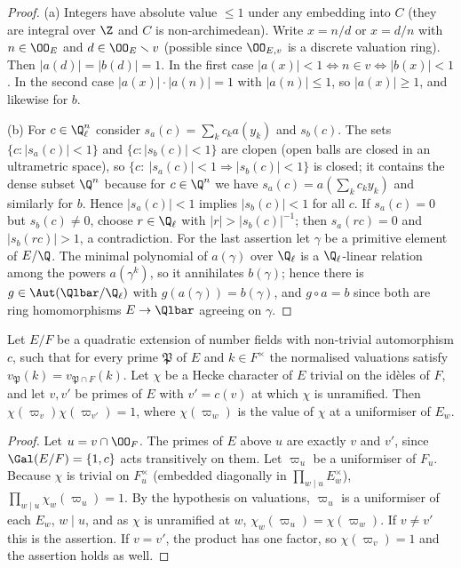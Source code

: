 \begin{proof}
(a) Integers have absolute value $\le1$ under any embedding into $C$ (they are integral over $\Z$ and $C$ is
non-archimedean). Write $x=n/d$ or $x=d/n$ with $n\in\OO_E$ and $d\in\OO_E\smallsetminus v$ (possible since
$\OO_{E,v}$ is a discrete valuation ring). Then $|a(d)|=|b(d)|=1$. In the first case
$|a(x)|<1\iff n\in v\iff|b(x)|<1$. In the second case $|a(x)|\cdot|a(n)|=1$ with $|a(n)|\le1$, so $|a(x)|\ge1$, and
likewise for $b$.

(b) For $c\in\Q_\ell^n$ consider $s_a(c)=\sum_kc_ka(y_k)$ and $s_b(c)$. The sets $\{c:|s_a(c)|<1\}$ and $\{c:|s_b(c)|<1\}$
are clopen (open balls are closed in an ultrametric space), so $\{c:\ |s_a(c)|<1\Rightarrow|s_b(c)|<1\}$ is closed; it
contains the dense subset $\Q^n$ because for $c\in\Q^n$ we have $s_a(c)=a(\sum_kc_ky_k)$ and similarly for $b$. Hence
$|s_a(c)|<1$ implies $|s_b(c)|<1$ for all $c$. If $s_a(c)=0$ but $s_b(c)\ne0$, choose $r\in\Q_\ell$ with
$|r|>|s_b(c)|^{-1}$; then $s_a(rc)=0$ and $|s_b(rc)|>1$, a contradiction. For the last assertion let $\gamma$ be a
primitive element of $E/\Q$. The minimal polynomial of $a(\gamma)$ over $\Q_\ell$ is a $\Q_\ell$-linear relation among
the powers $a(\gamma^k)$, so it annihilates $b(\gamma)$; hence there is $g\in\Aut(\Qlbar/\Q_\ell)$ with $g(a(\gamma))=b(\gamma)$,
and $g\circ a=b$ since both are ring homomorphisms $E\to\Qlbar$ agreeing on $\gamma$.
\end{proof}

\begin{lemma}\label{pf:baselat2:antiladic}
Let $E/F$ be a quadratic extension of number fields with non-trivial automorphism $c$, such that for every
prime $\mathfrak P$ of $E$ and $k\in F^\times$ the normalised valuations satisfy
$v_{\mathfrak P}(k)=v_{\mathfrak P\cap F}(k)$. Let $\chi$ be a Hecke character of $E$ trivial on the id\`eles of $F$, and let
$v,v'$ be primes of $E$ with $v'=c(v)$ at which $\chi$ is unramified. Then $\chi(\varpi_v)\chi(\varpi_{v'})=1$, where
$\chi(\varpi_w)$ is the value of $\chi$ at a uniformiser of $E_w$.
\end{lemma}

\begin{proof}
Let $u=v\cap\OO_F$. The primes of $E$ above $u$ are exactly $v$ and $v'$, since $\Gal(E/F)=\{1,c\}$ acts transitively on
them. Let $\varpi_u$ be a uniformiser of $F_u$. Because $\chi$ is trivial on $F_u^\times$ (embedded diagonally in
$\prod_{w\mid u}E_w^\times$), $\prod_{w\mid u}\chi_w(\varpi_u)=1$. By the hypothesis on valuations, $\varpi_u$ is a
uniformiser of each $E_w$, $w\mid u$, and as $\chi$ is unramified at $w$, $\chi_w(\varpi_u)=\chi(\varpi_w)$. If $v\ne v'$ this
is the assertion. If $v=v'$, the product has one factor, so $\chi(\varpi_v)=1$ and the assertion holds as well.
\end{proof}

